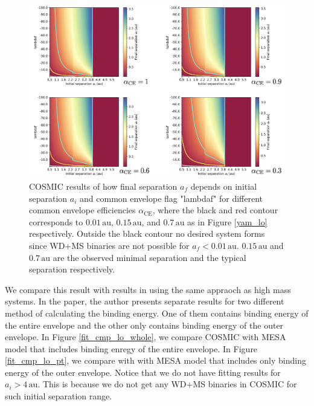 \documentclass[12pt]{article}
\newcommand{\alphace}{\alpha_{\mathrm{CE}}}
\newcommand{\au}{\, \mathrm{au}}
\begin{document}
\begin{figure}
    \centering
    \includegraphics[width=0.9\linewidth]{fig/1.5+0.8results.png}
    \caption{COSMIC results of how final separation $a_f$ depends on initial separation $a_i$ and common envelope flag "lambdaf" for different common envelope efficiencies $\alphace$, where the black and red contour corresponds to $0.01 \au$, $0.15 \au$, and $0.7 \au$ as in Figure \ref{yam_lo} respectively. Outside the black contour no desired system forms since WD+MS binaries are not possible for $a_f < 0.01\au$. $0.15\au$ and $0.7\au$ are the observed minimal separation and the typical separation respectively.}
    \label{res_lo}
\end{figure}

We compare this result with results in \cite{yamaguchi_lo} using the same appraoch as high mass systems. In the paper, the author presents separate results for two different method of calculating the binding energy. One of them contains binding energy of the entire envelope and the other only contains binding energy of the outer envelope. In Figure \ref{fit_cmp_lo_whole}, we compare COSMIC with MESA model that includes binding enregy of the entire envelope. In Figure \ref{fit_cmp_lo_pt}, we compare with with MESA model that includes only binding energy of the outer envelope. Notice that we do not have fitting results for $a_i > 4 \au$. This is because we do not get any WD+MS binaries in COSMIC for such initial separation range.
\end{document}
